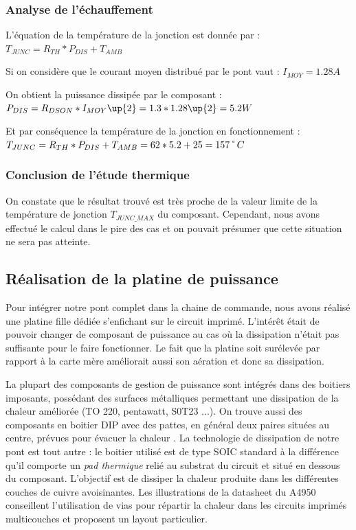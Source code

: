 \documentclass[11pt, french]{article} %
\begin{document}
\subsubsection{Analyse de l'échauffement}

\noindent
L'équation de la température de la jonction est donnée par : \newline
\medskip
\noindent
$ T_{JUNC} = R_{TH} * P_{DIS} + T_{AMB} $

\medskip
\noindent
Si on considère que le courant moyen distribué par le pont vaut : \newline
$ I_{MOY} = 1.28 A $

\medskip
\noindent
On obtient la puissance dissipée par le composant : \newline
$ P_{DIS} = R_{DSON} * I_{MOY}\up{2} = 1.3 * 1.28\up{2} = 5.2 W $

\medskip
\noindent
Et par conséquence la température de la jonction en fonctionnement : \newline
$ T_{JUNC} = R_{TH} * P_{DIS} +  T_{AMB} = 62 * 5.2 + 25 = 157 \char23 C $

\subsubsection{Conclusion de l'étude thermique}

	On constate que le résultat trouvé est très proche de la valeur limite de la température de jonction $ T_{JUNC\_{MAX}} $ du composant. Cependant, nous avons effectué le calcul dans le pire des cas et on pouvait présumer que cette situation ne sera pas atteinte.

\subsection{Réalisation de la platine de puissance}
Pour intégrer notre pont complet dans la chaine de commande, nous avons réalisé une platine fille dédiée s'enfichant sur le circuit imprimé. L'intérêt était de pouvoir changer de composant de puissance au cas où la dissipation n'était pas suffisante pour le faire fonctionner. Le fait que la platine soit surélevée par rapport à la carte mère améliorait aussi son aération et donc sa dissipation.

La plupart des composants de gestion de puissance sont intégrés dans des boitiers imposants, possédant des surfaces métalliques permettant une dissipation de la chaleur améliorée (TO 220, pentawatt, S0T23 ...). On trouve aussi des composants en boitier DIP avec des pattes, en général deux paires situées au centre, prévues pour évacuer la chaleur . La technologie de dissipation de notre pont est tout autre : le boitier utilisé est de type SOIC standard à la différence qu'il comporte un \emph{pad thermique} relié au substrat du circuit et situé en dessous du composant. L'objectif est de dissiper la chaleur produite dans les différentes couches de cuivre avoisinantes. Les illustrations de la datasheet du A4950 conseillent l'utilisation de vias pour répartir la chaleur dans les circuits imprimés multicouches et proposent un layout particulier.
\end{document}

